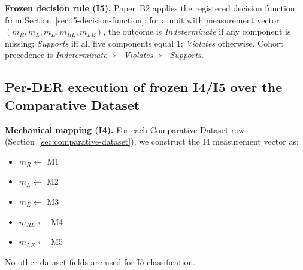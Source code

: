 \textbf{Frozen decision rule (I5).} Paper~B2 applies the registered decision function from Section~\ref{sec:i5-decision-function}: for a unit with measurement vector $(m_R,m_L,m_E,m_{RL},m_{LE})$, the outcome is \emph{Indeterminate} if any component is missing; \emph{Supports} iff all five components equal 1; \emph{Violates} otherwise. Cohort precedence is \emph{Indeterminate} $\succ$ \emph{Violates} $\succ$ \emph{Supports}.

\subsection{Per-DER execution of frozen I4/I5 over the Comparative Dataset}
\label{sec:per-der-i5-execution}
\textbf{Mechanical mapping (I4).} For each Comparative Dataset row (Section~\ref{sec:comparative-dataset}), we construct the I4 measurement vector as:
\begin{itemize}
  \item $m_R \leftarrow$ M1
  \item $m_L \leftarrow$ M2
  \item $m_E \leftarrow$ M3
  \item $m_{RL} \leftarrow$ M4
  \item $m_{LE} \leftarrow$ M5
\end{itemize}
No other dataset fields are used for I5 classification.


